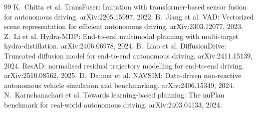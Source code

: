 \documentclass[10pt,twocolumn]{article}
\theoremstyle{remark}
\begin{document}
\begin{thebibliography}{99}
 K.~Chitta et al. TransFuser: Imitation with transformer-based sensor fusion for autonomous driving. arXiv:2205.15997, 2022.
 B.~Jiang et al. VAD: Vectorized scene representation for efficient autonomous driving. arXiv:2303.12077, 2023.
 Z.~Li et al. Hydra-MDP: End-to-end multimodal planning with multi-target hydra-distillation. arXiv:2406.06978, 2024.
 B.~Liao et al. DiffusionDrive: Truncated diffusion model for end-to-end autonomous driving. arXiv:2411.15139, 2024.
 ResAD: normalised residual trajectory modelling for end-to-end driving. arXiv:2510.08562, 2025.
 D.~Dauner et al. NAVSIM: Data-driven non-reactive autonomous vehicle simulation and benchmarking. arXiv:2406.15349, 2024.
 N.~Karnchanachari et al. Towards learning-based planning: The nuPlan benchmark for real-world autonomous driving. arXiv:2403.04133, 2024.
\end{thebibliography}
\end{document}
